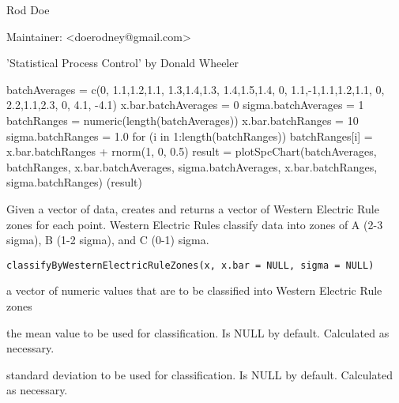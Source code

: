 \documentclass[a4paper]{book}
\begin{document}
%
\begin{Author}\relax
Rod Doe

Maintainer: <doerodney@gmail.com>

\end{Author}
%
\begin{References}\relax
'Statistical Process Control' by Donald Wheeler
\end{References}
%
\begin{Examples}
\begin{ExampleCode}
batchAverages = c(0, 1.1,1.2,1.1,  1.3,1.4,1.3, 1.4,1.5,1.4,   0,  1.1,-1,1.1,1.2,1.1,   0,  2.2,1.1,2.3,   0,   4.1, -4.1)
x.bar.batchAverages = 0 
sigma.batchAverages = 1
batchRanges = numeric(length(batchAverages))
x.bar.batchRanges = 10
sigma.batchRanges = 1.0
for (i in 1:length(batchRanges)) { batchRanges[i] = x.bar.batchRanges + rnorm(1, 0, 0.5) }
result = plotSpcChart(batchAverages, batchRanges, x.bar.batchAverages, sigma.batchAverages, x.bar.batchRanges, sigma.batchRanges)
(result)
\end{ExampleCode}
\end{Examples}
%
\begin{Description}\relax
Given a vector of data, creates and returns a vector of Western Electric Rule zones for each point.
Western Electric Rules classify data into zones of A (2-3 sigma), B (1-2 sigma), and C (0-1) sigma.
\end{Description}
%
\begin{Usage}
\begin{verbatim}
classifyByWesternElectricRuleZones(x, x.bar = NULL, sigma = NULL)
\end{verbatim}
\end{Usage}
%
\begin{Arguments}
\begin{ldescription}
\item[\code{x}] 
a vector of numeric values that are to be classified into Western Electric Rule zones

\item[\code{x.bar}] 
the mean value to be used for classification.  Is NULL by default.  Calculated as necessary.

\item[\code{sigma}] 
standard deviation to be used for classification.  Is NULL by default.  Calculated as necessary.

\end{ldescription}
\end{Arguments}
\end{document}
